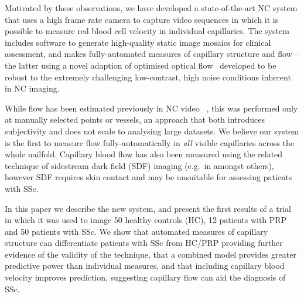 \documentclass[runningheads,a4paper]{llncs}
\def\eg{e.g.}
\begin{document}
Motivated by these observations, we have developed a state-of-the-art NC system that uses a high frame rate camera to capture video sequences in which it is possible to measure red blood cell velocity in individual capillaries. The system includes software to generate high-quality static image mosaics for clinical assessment, and makes fully-automated measures of capillary structure and flow -- the latter using a novel adaption of optimised optical flow~\cite{BroxECCV04} developed to be robust to the extremely challenging low-contrast, high noise conditions inherent in NC imaging. 

While flow has been estimated previously in NC video ~\cite{Mawson_Shore_JMET98,Shih_etal_MR11}, this was performed only at manually selected points or vessels, an approach that both introduces subjectivity and does not scale to analysing large datasets. We believe our system is the first to measure flow fully-automatically in \textit{all} visible capillaries across the whole nailfold. Capillary blood flow has also been measured using the related technique of sidestream dark field (SDF) imaging (\eg~in \cite{DobbeMBEC08} amongst others), however SDF requires skin contact and may be unsuitable for assessing patients with SSc.

In this paper we describe the new system, and present the first results of a trial in which it was used to image 50 healthy controls (HC), 12 patients with PRP and 50 patients with SSc. We show that automated measures of capillary structure can differentiate patients with SSc from HC/PRP providing further evidence of the validity of the technique, that a combined model provides greater predictive power than individual measures, and that including capillary blood velocity improves prediction, suggesting capillary flow can aid the diagnosis of SSc.
%
\end{document}
